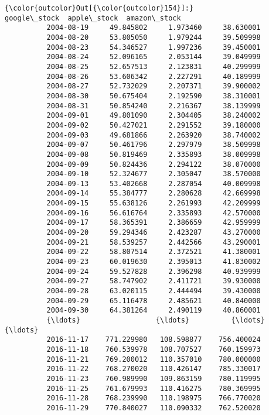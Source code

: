 \documentclass[11pt]{article}
\begin{document}
\begin{Verbatim}[commandchars=\\\{\}]
{\color{outcolor}Out[{\color{outcolor}154}]:}             google\_stock  apple\_stock  amazon\_stock
          2004-08-19     49.845802     1.973460     38.630001
          2004-08-20     53.805050     1.979244     39.509998
          2004-08-23     54.346527     1.997236     39.450001
          2004-08-24     52.096165     2.053144     39.049999
          2004-08-25     52.657513     2.123831     40.299999
          2004-08-26     53.606342     2.227291     40.189999
          2004-08-27     52.732029     2.207371     39.900002
          2004-08-30     50.675404     2.192590     38.310001
          2004-08-31     50.854240     2.216367     38.139999
          2004-09-01     49.801090     2.304405     38.240002
          2004-09-02     50.427021     2.291552     39.180000
          2004-09-03     49.681866     2.263920     38.740002
          2004-09-07     50.461796     2.297979     38.509998
          2004-09-08     50.819469     2.335893     38.009998
          2004-09-09     50.824436     2.294122     38.070000
          2004-09-10     52.324677     2.305047     38.570000
          2004-09-13     53.402668     2.287054     40.009998
          2004-09-14     55.384777     2.280628     42.669998
          2004-09-15     55.638126     2.261993     42.209999
          2004-09-16     56.616764     2.335893     42.570000
          2004-09-17     58.365391     2.386659     42.959999
          2004-09-20     59.294346     2.423287     43.270000
          2004-09-21     58.539257     2.442566     43.290001
          2004-09-22     58.807514     2.372521     41.380001
          2004-09-23     60.019630     2.395013     41.830002
          2004-09-24     59.527828     2.396298     40.939999
          2004-09-27     58.747902     2.411721     39.930000
          2004-09-28     63.020115     2.444494     39.430000
          2004-09-29     65.116478     2.485621     40.840000
          2004-09-30     64.381264     2.490119     40.860001
          {\ldots}                  {\ldots}          {\ldots}           {\ldots}
          2016-11-17    771.229980   108.598877    756.400024
          2016-11-18    760.539978   108.707527    760.159973
          2016-11-21    769.200012   110.357010    780.000000
          2016-11-22    768.270020   110.426147    785.330017
          2016-11-23    760.989990   109.863159    780.119995
          2016-11-25    761.679993   110.416275    780.369995
          2016-11-28    768.239990   110.198975    766.770020
          2016-11-29    770.840027   110.090332    762.520020

\end{Verbatim}
\end{document}

